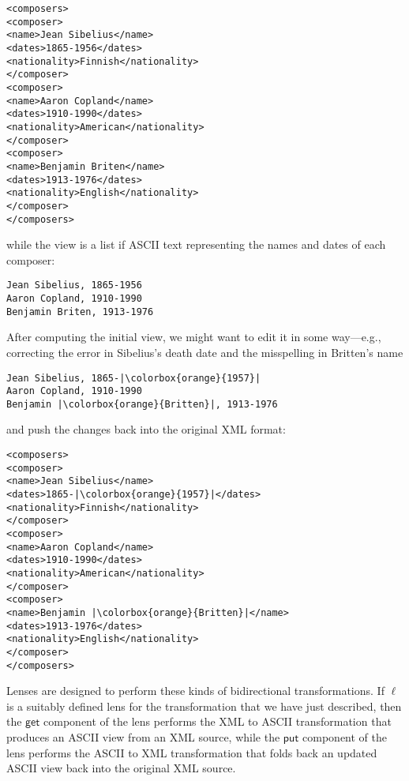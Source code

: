 \documentclass[acmsmall,review,anonymous]{acmart}\settopmatter{printfolios=true,printccs=false,printacmref=false}
\theoremstyle{definition}
\newcommand{\kw}[1]{\ensuremath{\mathsf{#1}}\xspace}
\newcommand{\get}{\ensuremath{\kw{get}}\xspace}
\newcommand{\pput}{\ensuremath{\kw{put}}\xspace}
\begin{document}
\begin{lstlisting}
<composers>
<composer>
<name>Jean Sibelius</name>
<dates>1865-1956</dates>
<nationality>Finnish</nationality>
</composer>
<composer>
<name>Aaron Copland</name>
<dates>1910-1990</dates>
<nationality>American</nationality>
</composer>
<composer>
<name>Benjamin Briten</name>
<dates>1913-1976</dates>
<nationality>English</nationality>
</composer>
</composers>
\end{lstlisting}

while the view is a list if ASCII text representing the names and dates of each
composer:
\begin{lstlisting}
Jean Sibelius, 1865-1956
Aaron Copland, 1910-1990
Benjamin Briten, 1913-1976
\end{lstlisting}

After computing the initial view, we might want to edit it in some way---e.g.,
correcting the error in Sibelius's death date and the misspelling in Britten's
name
\begin{lstlisting}
Jean Sibelius, 1865-|\colorbox{orange}{1957}|
Aaron Copland, 1910-1990
Benjamin |\colorbox{orange}{Britten}|, 1913-1976
\end{lstlisting}
and push the changes back into the original XML format:
\begin{lstlisting}
<composers>
<composer>
<name>Jean Sibelius</name>
<dates>1865-|\colorbox{orange}{1957}|</dates>
<nationality>Finnish</nationality>
</composer>
<composer>
<name>Aaron Copland</name>
<dates>1910-1990</dates>
<nationality>American</nationality>
</composer>
<composer>
<name>Benjamin |\colorbox{orange}{Britten}|</name>
<dates>1913-1976</dates>
<nationality>English</nationality>
</composer>
</composers>
\end{lstlisting}

Lenses are designed to perform these kinds of bidirectional transformations. If
$\ell$ is a suitably defined lens for the transformation that we
have just described, then the \get component of the lens performs the
XML to ASCII transformation that produces an ASCII view from an XML source,
while the \pput component of the lens performs the ASCII to XML transformation
that folds back an updated ASCII view back into the original XML source.
\end{document}

